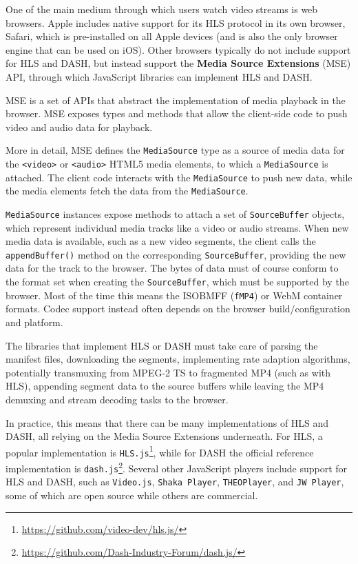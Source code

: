 One of the main medium through which users watch video streams is web browsers. Apple includes native support for its HLS protocol in its own browser, Safari, which is pre-installed on all Apple devices (and is also the only browser engine that can be used on iOS). Other browsers typically do not include support for HLS and DASH, but instead support the \textbf{Media Source Extensions} (MSE) API, through which JavaScript libraries can implement HLS and DASH.\cite{mse}

MSE is a set of APIs that abstract the implementation of media playback in the browser. MSE exposes types and methods that allow the client-side code to push video and audio data for playback.

More in detail, MSE defines the \texttt{MediaSource} type as a source of media data for the \texttt{<video>} or \texttt{<audio>} HTML5 media elements, to which a \texttt{MediaSource} is attached. The client code interacts with the \texttt{MediaSource} to push new data, while the media elements fetch the data from the \texttt{MediaSource}.

\texttt{MediaSource} instances expose methods to attach a set of \texttt{SourceBuffer} objects, which represent individual media tracks like a video or audio streams. When new media data is available, such as a new video segments, the client calls the \texttt{appendBuffer()} method on the corresponding \texttt{SourceBuffer}, providing the new data for the track to the browser. The bytes of data must of course conform to the format set when creating the \texttt{SourceBuffer}, which must be supported by the browser. Most of the time this means the ISOBMFF (\texttt{fMP4}) or WebM container formats. Codec support instead often depends on the browser build/configuration and platform.

The libraries that implement HLS or DASH must take care of parsing the manifest files, downloading the segments, implementing rate adaption algorithms, potentially transmuxing from MPEG-2 TS to fragmented MP4 (such as with HLS), appending segment data to the source buffers while leaving the MP4 demuxing and stream decoding tasks to the browser.

In practice, this means that there can be many implementations of HLS and DASH, all relying on the Media Source Extensions underneath. For HLS, a popular implementation is \texttt{HLS.js}\footnote{\url{https://github.com/video-dev/hls.js/}}, while for DASH the official reference implementation is \texttt{dash.js}\footnote{\url{https://github.com/Dash-Industry-Forum/dash.js/}}. Several other JavaScript players include support for HLS and DASH, such as \texttt{Video.js}, \texttt{Shaka Player}, \texttt{THEOPlayer}, and \texttt{JW Player}, some of which are open source while others are commercial.

